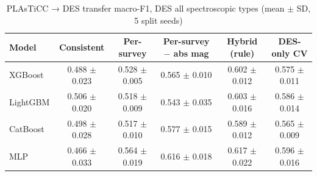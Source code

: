 \begin{table}
\centering
\caption{PLAsTiCC → DES transfer macro-F1, DES all spectroscopic types (mean $\pm$ SD, 5 split seeds)}
\begin{tabular}{lccccc}
\hline
Model & Consistent & Per-survey & Per-survey $-$ abs mag & Hybrid (rule) & DES-only CV \\
\hline
XGBoost & 0.488 $\pm$ 0.023 & 0.528 $\pm$ 0.005 & 0.565 $\pm$ 0.010 & 0.602 $\pm$ 0.012 & 0.575 $\pm$ 0.011 \\
LightGBM & 0.506 $\pm$ 0.020 & 0.518 $\pm$ 0.009 & 0.543 $\pm$ 0.035 & 0.603 $\pm$ 0.016 & 0.586 $\pm$ 0.014 \\
CatBoost & 0.498 $\pm$ 0.028 & 0.517 $\pm$ 0.010 & 0.577 $\pm$ 0.015 & 0.589 $\pm$ 0.012 & 0.565 $\pm$ 0.009 \\
MLP & 0.466 $\pm$ 0.033 & 0.564 $\pm$ 0.019 & 0.616 $\pm$ 0.018 & 0.617 $\pm$ 0.022 & 0.596 $\pm$ 0.016 \\
\hline
\end{tabular}
\end{table}
